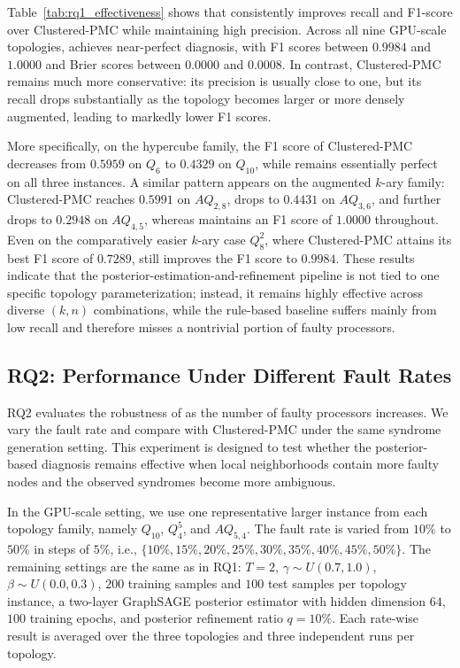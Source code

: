 Table~\ref{tab:rq1_effectiveness} shows that \tool consistently improves recall and F1-score over Clustered-PMC while maintaining high precision. Across all nine GPU-scale topologies, \tool achieves near-perfect diagnosis, with F1 scores between $0.9984$ and $1.0000$ and Brier scores between $0.0000$ and $0.0008$. In contrast, Clustered-PMC remains much more conservative: its precision is usually close to one, but its recall drops substantially as the topology becomes larger or more densely augmented, leading to markedly lower F1 scores.

More specifically, on the hypercube family, the F1 score of Clustered-PMC decreases from $0.5959$ on $Q_6$ to $0.4329$ on $Q_{10}$, while \tool remains essentially perfect on all three instances. A similar pattern appears on the augmented $k$-ary family: Clustered-PMC reaches $0.5991$ on $AQ_{2,8}$, drops to $0.4431$ on $AQ_{3,6}$, and further drops to $0.2948$ on $AQ_{4,5}$, whereas \tool maintains an F1 score of $1.0000$ throughout. Even on the comparatively easier $k$-ary case $Q_8^2$, where Clustered-PMC attains its best F1 score of $0.7289$, \tool still improves the F1 score to $0.9984$. These results indicate that the posterior-estimation-and-refinement pipeline is not tied to one specific topology parameterization; instead, it remains highly effective across diverse $(k,n)$ combinations, while the rule-based baseline suffers mainly from low recall and therefore misses a nontrivial portion of faulty processors.

\subsection{RQ2: Performance Under Different Fault Rates}
\label{subsec:rq2_fault_rate}

RQ2 evaluates the robustness of \tool as the number of faulty processors increases. We vary the fault rate and compare \tool with Clustered-PMC under the same syndrome generation setting. This experiment is designed to test whether the posterior-based diagnosis remains effective when local neighborhoods contain more faulty nodes and the observed syndromes become more ambiguous.

In the GPU-scale setting, we use one representative larger instance from each topology family, namely $Q_{10}$, $Q_4^5$, and $AQ_{5,4}$. The fault rate is varied from $10\%$ to $50\%$ in steps of $5\%$, i.e., $\{10\%, 15\%, 20\%, 25\%, 30\%, 35\%, 40\%, 45\%, 50\%\}$. The remaining settings are the same as in RQ1: $T=2$, $\gamma \sim U(0.7, 1.0)$, $\beta \sim U(0.0, 0.3)$, $200$ training samples and $100$ test samples per topology instance, a two-layer GraphSAGE posterior estimator with hidden dimension $64$, $100$ training epochs, and posterior refinement ratio $q=10\%$. Each rate-wise result is averaged over the three topologies and three independent runs per topology.


